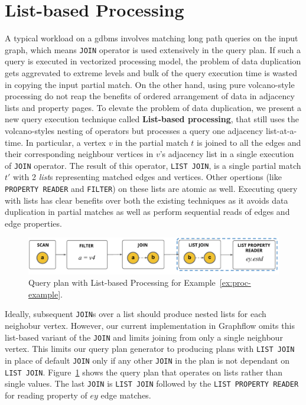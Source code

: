 \section{List-based Processing}
\label{sec:list-based-proc}

A typical workload on a \gls{gdbms} involves matching long path queries on the input graph, which means \texttt{JOIN} operator is used extensively in the query plan. If such a query is executed in vectorized processing model, the problem of data duplication gets aggrevated to extreme levels and bulk of the query execution time is wasted in copying the input partial match. On the other hand, using pure volcano-style processing do not reap the benefits of ordered arrangement of data in adjacency lists and property pages. To elevate the problem of data duplication, we present a new query execution technique called \textbf{List-based processing}, that still uses the volcano-styles nesting of operators but processes a query one adjacency list-at-a-time. In particular, a vertex $v$ in the partial match $t$ is joined to all the edges and their corresponding neighbour vertices in $v$'s adjacency list in a single execution of \texttt{JOIN} operator. The result of this operator, \texttt{LIST JOIN}, is a single partial match $t'$ with 2 \emph{list}s representing matched edges and vertices. Other opertions (like \texttt{PROPERTY READER} and \texttt{FILTER}) on these lists are atomic as well. Executing query with lists has clear benefits over both the existing techniques as it avoids data duplication in partial matches as well as perform sequential reads of edges and edge properties.

\begin{figure}
	\hfill\includegraphics[scale=0.78]{img/proc-lbqp}\hfill
	\vspace{-10pt}
	\caption{Query plan with List-based Processing for Example~\ref{ex:proc-example}.}
	\vspace{-8pt}
	\label{fig:proc-lbqp}
\end{figure}

Ideally, subsequent \texttt{JOIN}s over a list should produce nested lists for each neighobur vertex. However, our current implementation in Graphflow omits this list-based variant of the \texttt{JOIN} and limits joining from only a single neighbour vertex. This limits our query plan generator to producing plans with \texttt{LIST JOIN} in place of default \texttt{JOIN} only if any other \texttt{JOIN} in the plan is not dependant on \texttt{LIST JOIN}. Figure~\ref{fig:proc-lbqp} shows the query plan that operates on lists rather than single values. The last \texttt{JOIN} is \texttt{LIST JOIN} followed by the \texttt{LIST PROPERTY READER} for reading property of $ey$ edge matches. 









